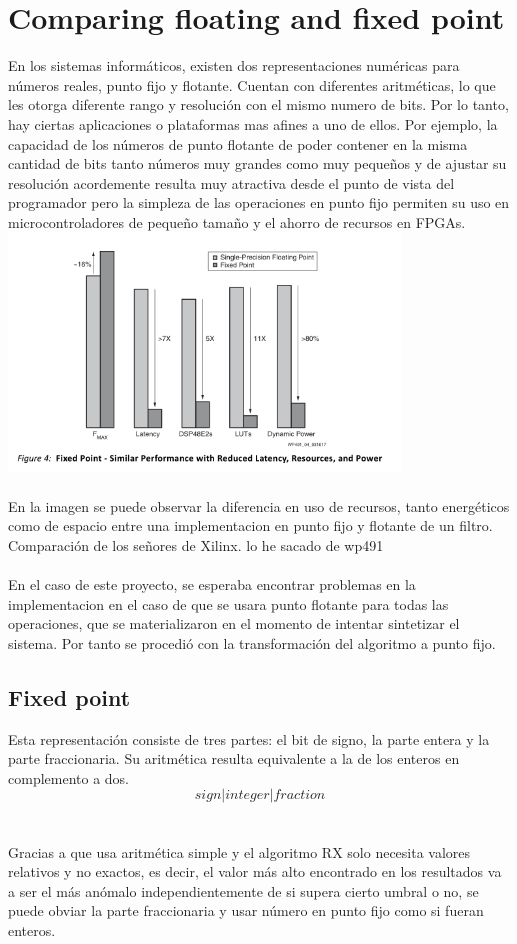 \cleardoublepage
\chapter{Comparing floating and fixed point}
\label{makereference}

En los sistemas informáticos, existen dos representaciones numéricas para números reales, punto fijo y flotante. Cuentan con diferentes aritméticas, lo que les otorga diferente rango y resolución con el mismo numero de bits. Por lo tanto, hay ciertas aplicaciones o plataformas mas afines a uno de ellos. Por ejemplo, la capacidad de los números de punto flotante de poder contener en la misma cantidad de bits tanto números muy grandes como muy pequeños y de ajustar su resolución acordemente resulta muy atractiva desde el punto de vista del programador pero la simpleza de las operaciones en punto fijo permiten su uso en microcontroladores de pequeño tamaño y el ahorro de recursos en FPGAs.
\\
\includegraphics[height=2.5in]{figures/fp_vs_fp.png}
\\
\\
En la imagen se puede observar la diferencia en uso de recursos, tanto energéticos como de espacio entre una implementacion en punto fijo y flotante de un filtro.
Comparación de los señores de Xilinx. lo he sacado de wp491
\\
\\
En el caso de este proyecto, se esperaba encontrar problemas en la implementacion en el caso de que se usara punto flotante para todas las operaciones, que se materializaron en el momento de intentar sintetizar el sistema. Por tanto se procedió con la transformación del algoritmo a punto fijo.

\section{Fixed point}
Esta representación consiste de tres partes: el bit de signo, la parte entera y la parte fraccionaria. Su aritmética resulta equivalente a la de los enteros en complemento a dos.
\[sign | integer | fraction\]
\\
\\
Gracias a que usa aritmética simple y el algoritmo RX solo necesita valores relativos y no exactos, es decir, el valor más alto encontrado en los resultados va a ser el más anómalo independientemente de si supera cierto umbral o no, se puede obviar la parte fraccionaria y usar número en punto fijo como si fueran enteros.

